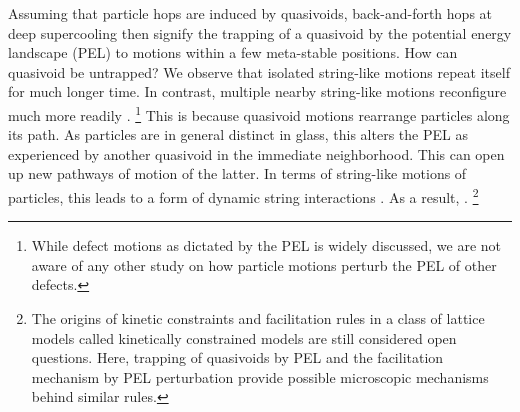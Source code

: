 \documentclass[aps,rmp,tighten,twocolumn,floatfix,a4paper,longbibliography]{revtex4-1}
\begin{document}
{
}

{
}



\twocol
{
  Assuming that particle hops are induced by quasivoids, back-and-forth hops at deep supercooling then signify the trapping of a quasivoid by the potential energy landscape (PEL) to motions within a few meta-stable positions. How can quasivoid be untrapped? 
We observe that isolated string-like motions repeat itself for much longer time. In contrast, multiple nearby string-like motions reconfigure much more readily \cite{lam2017,yip2020}.  
  \footnote{While defect motions as dictated by the PEL is widely discussed, we are not aware of any other study on how particle motions perturb the PEL of other defects.}
This is because quasivoid motions rearrange particles along its path. As particles are in general distinct in glass, this alters the PEL as experienced by another quasivoid in the immediate neighborhood.
This can open up new pathways of motion of the latter. In terms of string-like motions of particles, this leads to a form of dynamic string interactions \cite{lam2017}.
As a result, .
\footnote{The origins of kinetic constraints and facilitation rules in a class of lattice models called kinetically constrained models are still considered open questions. Here, trapping of quasivoids by PEL and  the facilitation mechanism by PEL perturbation provide possible microscopic mechanisms behind similar rules. }
}{
  \twocol
    {}
    {  }
}
\end{document}

